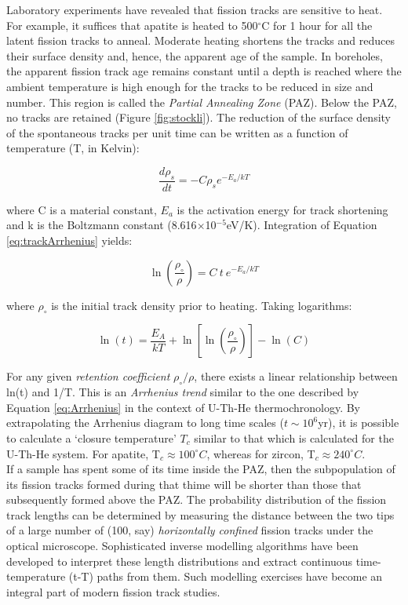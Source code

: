 \documentclass{book}
\begin{document}
Laboratory experiments have revealed that fission tracks are sensitive
to heat.  For example, it suffices that apatite is heated to
500$^{\circ}$C for 1 hour for all the latent fission tracks to
anneal. Moderate heating shortens the tracks and reduces their surface
density and, hence, the apparent age of the sample. In boreholes, the
apparent fission track age remains constant until a depth is reached
where the ambient temperature is high enough for the tracks to be
reduced in size and number.  This region is called the \emph{Partial
  Annealing Zone} (PAZ). Below the PAZ, no tracks are retained (Figure
\ref{fig:stockli}). The reduction of the surface density of the
spontaneous tracks per unit time can be written as a function of
temperature (T, in Kelvin):

\begin{equation}
\frac{d\rho_s}{dt} = -C \rho_s e^{-E_a/kT}
\label{eq:trackArrhenius}
\end{equation}

where C is a material constant, $E_a$ is the activation energy for
track shortening and k is the Boltzmann constant
(8.616$\times$10$^{-5}$eV/K). Integration of Equation
\ref{eq:trackArrhenius} yields:

\begin{equation}
\ln\left(\frac{\rho_\circ}{\rho}\right) = C~t~e^{-E_a/kT}
\label{eq:lnrho0rho}
\end{equation}

where $\rho_\circ$ is the initial track density prior to
heating. Taking logarithms:

\begin{equation}
\ln(t) = \frac{E_A}{kT} + \ln\left[\ln\left(\frac{\rho_\circ}{\rho}\right)\right] - \ln(C)
\label{eq:lnt}
\end{equation}

For any given \emph{retention coefficient} $\rho_\circ/\rho$, there
exists a linear relationship between ln(t) and 1/T. This is an
\emph{Arrhenius trend} similar to the one described by Equation
\ref{eq:Arrhenius} in the context of U-Th-He thermochronology.  By
extrapolating the Arrhenius diagram to long time scales
($t\sim10^6$yr), it is possible to calculate a `closure temperature'
$T_c$ similar to that which is calculated for the U-Th-He system. For
apatite, T$_c \approx 100^{\circ}C$, whereas for zircon, T$_c \approx
240^{\circ}C$.\\

If a sample has spent some of its time inside the PAZ, then the
subpopulation of its fission tracks formed during that thime will be
shorter than those that subsequently formed above the PAZ. The
probability distribution of the fission track lengths can be
determined by measuring the distance between the two tips of a large
number of (100, say) \emph{horizontally confined} fission tracks under
the optical microscope.  Sophisticated inverse modelling algorithms
have been developed to interpret these length distributions and
extract continuous time-temperature (t-T) paths from them. Such
modelling exercises have become an integral part of modern fission
track studies.
\end{document}
